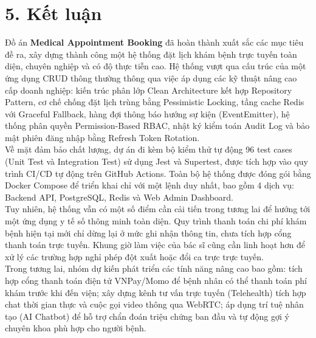 \documentclass[12pt,a4paper]{report}
\begin{document}
\newpage

\section*{5. Kết luận}
\hspace{1em} Đồ án \textbf{Medical Appointment Booking} đã hoàn thành xuất sắc các mục tiêu đề ra, xây dựng thành công một hệ thống đặt lịch khám bệnh trực tuyến toàn diện, chuyên nghiệp và có độ thực tiễn cao. Hệ thống vượt qua cấu trúc của một ứng dụng CRUD thông thường thông qua việc áp dụng các kỹ thuật nâng cao cấp doanh nghiệp: kiến trúc phân lớp Clean Architecture kết hợp Repository Pattern, cơ chế chống đặt lịch trùng bằng Pessimistic Locking, tầng cache Redis với Graceful Fallback, hàng đợi thông báo hướng sự kiện (EventEmitter), hệ thống phân quyền Permission-Based RBAC, nhật ký kiểm toán Audit Log và bảo mật phiên đăng nhập bằng Refresh Token Rotation.
\\[0.4cm]
\indent Về mặt đảm bảo chất lượng, dự án đi kèm bộ kiểm thử tự động 96 test cases (Unit Test và Integration Test) sử dụng Jest và Supertest, được tích hợp vào quy trình CI/CD tự động trên GitHub Actions. Toàn bộ hệ thống được đóng gói bằng Docker Compose để triển khai chỉ với một lệnh duy nhất, bao gồm 4 dịch vụ: Backend API, PostgreSQL, Redis và Web Admin Dashboard.
\\[0.4cm]
\indent Tuy nhiên, hệ thống vẫn có một số điểm cần cải tiến trong tương lai để hướng tới một ứng dụng y tế số thông minh toàn diện. Quy trình thanh toán chi phí khám bệnh hiện tại mới chỉ dừng lại ở mức ghi nhận thông tin, chưa tích hợp cổng thanh toán trực tuyến. Khung giờ làm việc của bác sĩ cũng cần linh hoạt hơn để xử lý các trường hợp nghỉ phép đột xuất hoặc đổi ca trực trực tuyến.
\\[0.4cm]
\indent Trong tương lai, nhóm dự kiến phát triển các tính năng nâng cao bao gồm: tích hợp cổng thanh toán điện tử VNPay/Momo để bệnh nhân có thể thanh toán phí khám trước khi đến viện; xây dựng kênh tư vấn trực tuyến (Telehealth) tích hợp chat thời gian thực và cuộc gọi video thông qua WebRTC; áp dụng trí tuệ nhân tạo (AI Chatbot) để hỗ trợ chẩn đoán triệu chứng ban đầu và tự động gợi ý chuyên khoa phù hợp cho người bệnh.
\end{document}
